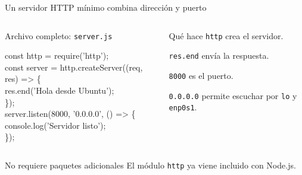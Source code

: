 \documentclass[aspectratio=169,10pt,c]{beamer}
\begin{document}
\begin{frame}{Un servidor HTTP mínimo combina dirección y puerto}
\begin{columns}[T,onlytextwidth]
\begin{exampleblock}{Archivo completo: \texttt{server.js}}
\begin{terminal}\footnotesize
const http = require('http');\\
const server = http.createServer((req, res) => \{\\
\quad res.end('Hola desde Ubuntu');\\
\});\\
server.listen(8000, '0.0.0.0', () => \{\\
\quad console.log('Servidor listo');\\
\});
\end{terminal}
\end{exampleblock}
\begin{block}{Qué hace}
\small
\texttt{http} crea el servidor.\par\medskip
\texttt{res.end} envía la respuesta.\par\medskip
\texttt{8000} es el puerto.\par\medskip
\texttt{0.0.0.0} permite escuchar por \texttt{lo} y \texttt{enp0s1}.
\end{block}
\end{columns}
\begin{alertblock}{No requiere paquetes adicionales}
\small El módulo \texttt{http} ya viene incluido con Node.js.
\end{alertblock}
\end{frame}
\end{document}
